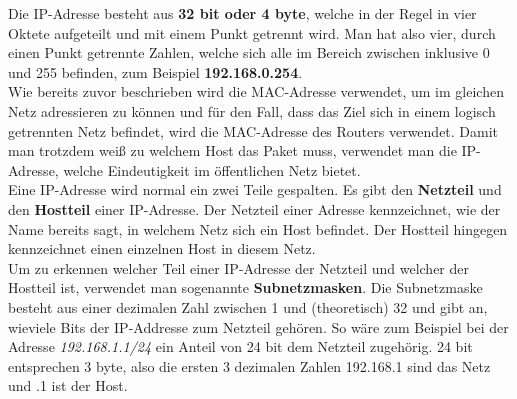 \documentclass[12pt,a4paper]{report}
\begin{document}
\begin{onehalfspace}
Die IP-Adresse besteht aus \textbf{32 bit oder 4 byte}, welche in der Regel in vier Oktete aufgeteilt und mit einem Punkt getrennt wird. Man hat also vier, durch einen Punkt getrennte Zahlen, welche sich alle im Bereich zwischen inklusive 0 und 255 befinden, zum Beispiel \textbf{192.168.0.254}.\\

Wie bereits zuvor beschrieben wird die MAC-Adresse verwendet, um im gleichen Netz adressieren zu können und für den Fall, dass das Ziel sich in einem logisch getrennten Netz befindet, wird die MAC-Adresse des Routers verwendet. Damit man trotzdem weiß zu welchem Host das Paket muss, verwendet man die IP-Adresse, welche Eindeutigkeit im öffentlichen Netz bietet.\\

Eine IP-Adresse wird normal ein zwei Teile gespalten. Es gibt den \textbf{Netzteil} und den \textbf{Hostteil} einer IP-Adresse. Der Netzteil einer Adresse kennzeichnet, wie der Name bereits sagt, in welchem Netz sich ein Host befindet. Der Hostteil hingegen kennzeichnet einen einzelnen Host in diesem Netz.\\
Um zu erkennen welcher Teil einer IP-Adresse der Netzteil und welcher der Hostteil ist, verwendet man sogenannte \textbf{Subnetzmasken}. Die Subnetzmaske besteht aus einer dezimalen Zahl zwischen 1 und (theoretisch) 32 und gibt an, wieviele Bits der IP-Addresse zum Netzteil gehören. So wäre zum Beispiel bei der Adresse \textit{192.168.1.1/24} ein Anteil von 24 bit dem Netzteil zugehörig. 24 bit entsprechen 3 byte, also die ersten 3 dezimalen Zahlen 192.168.1 sind das Netz und .1 ist der Host.

\end{onehalfspace}
\end{document}
